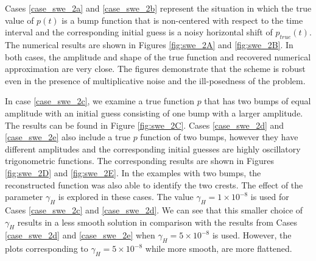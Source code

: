 
Cases \eqref{case_swe_2a} and \eqref{case_swe_2b} represent the situation in which the true value of $p(t)$ is a bump function that is non-centered with respect to the time interval and the corresponding initial guess is a noisy horizontal shift of $p_{true}(t)$. The numerical results are shown in Figures \ref{fig:swe_2A} and \ref{fig:swe_2B}. In both cases, the amplitude and shape of the true function and recovered numerical approximation are very close. The figures demonstrate that the scheme is robust even in the presence of multiplicative noise and the ill-posedness of the problem.

In case \eqref{case_swe_2c}, we examine a true function $p$ that has two bumps of equal amplitude with an initial guess consisting of one bump with a larger amplitude. The results can be found in Figure \ref{fig:swe_2C}. Cases \eqref{case_swe_2d} and \eqref{case_swe_2e} also include a true $p$ function of two bumps, however they have different amplitudes and the corresponding initial guesses are highly oscillatory trigonometric functions. The corresponding results are shown in Figures \ref{fig:swe_2D} and \ref{fig:swe_2E}. In the examples with two bumps, the reconstructed function was also able to identify the two crests. The effect of the parameter $\gamma_H$ is explored in these cases. The value $\gamma_H = 1 \times 10^{-8}$ is used for Cases 
\eqref{case_swe_2c} and \eqref{case_swe_2d}. We can see that this smaller choice of $\gamma_H$ results in a less smooth solution in comparison with the results from Cases \eqref{case_swe_2d} and \eqref{case_swe_2e} when $\gamma_H = 5\times 10^{-8}$ is used. However, the plots corresponding to $\gamma_H = 5\times 10^{-8}$ while more smooth, are more flattened. 

